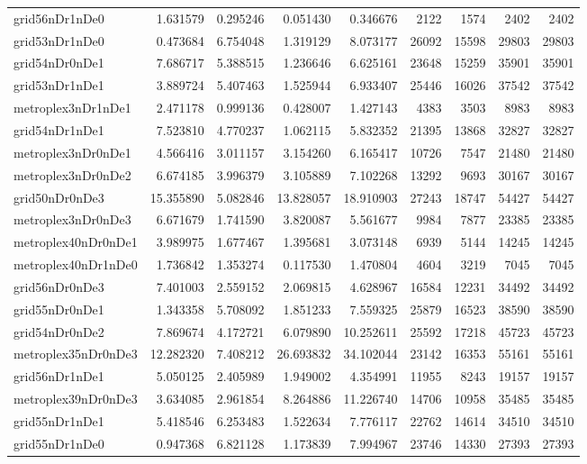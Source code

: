 \begin{longtable}{|l|r|r|r|r|r|r|r|r|}
grid56nDr1nDe0 & 1.631579 & 0.295246 & 0.051430 & 0.346676 & 2122 & 1574 & 2402 & 2402 \\
grid53nDr1nDe0 & 0.473684 & 6.754048 & 1.319129 & 8.073177 & 26092 & 15598 & 29803 & 29803 \\
grid54nDr0nDe1 & 7.686717 & 5.388515 & 1.236646 & 6.625161 & 23648 & 15259 & 35901 & 35901 \\
grid53nDr1nDe1 & 3.889724 & 5.407463 & 1.525944 & 6.933407 & 25446 & 16026 & 37542 & 37542 \\
metroplex3nDr1nDe1 & 2.471178 & 0.999136 & 0.428007 & 1.427143 & 4383 & 3503 & 8983 & 8983 \\
grid54nDr1nDe1 & 7.523810 & 4.770237 & 1.062115 & 5.832352 & 21395 & 13868 & 32827 & 32827 \\
metroplex3nDr0nDe1 & 4.566416 & 3.011157 & 3.154260 & 6.165417 & 10726 & 7547 & 21480 & 21480 \\
metroplex3nDr0nDe2 & 6.674185 & 3.996379 & 3.105889 & 7.102268 & 13292 & 9693 & 30167 & 30167 \\
grid50nDr0nDe3 & 15.355890 & 5.082846 & 13.828057 & 18.910903 & 27243 & 18747 & 54427 & 54427 \\
metroplex3nDr0nDe3 & 6.671679 & 1.741590 & 3.820087 & 5.561677 & 9984 & 7877 & 23385 & 23385 \\
metroplex40nDr0nDe1 & 3.989975 & 1.677467 & 1.395681 & 3.073148 & 6939 & 5144 & 14245 & 14245 \\
metroplex40nDr1nDe0 & 1.736842 & 1.353274 & 0.117530 & 1.470804 & 4604 & 3219 & 7045 & 7045 \\
grid56nDr0nDe3 & 7.401003 & 2.559152 & 2.069815 & 4.628967 & 16584 & 12231 & 34492 & 34492 \\
grid55nDr0nDe1 & 1.343358 & 5.708092 & 1.851233 & 7.559325 & 25879 & 16523 & 38590 & 38590 \\
grid54nDr0nDe2 & 7.869674 & 4.172721 & 6.079890 & 10.252611 & 25592 & 17218 & 45723 & 45723 \\
metroplex35nDr0nDe3 & 12.282320 & 7.408212 & 26.693832 & 34.102044 & 23142 & 16353 & 55161 & 55161 \\
grid56nDr1nDe1 & 5.050125 & 2.405989 & 1.949002 & 4.354991 & 11955 & 8243 & 19157 & 19157 \\
metroplex39nDr0nDe3 & 3.634085 & 2.961854 & 8.264886 & 11.226740 & 14706 & 10958 & 35485 & 35485 \\
grid55nDr1nDe1 & 5.418546 & 6.253483 & 1.522634 & 7.776117 & 22762 & 14614 & 34510 & 34510 \\
grid55nDr1nDe0 & 0.947368 & 6.821128 & 1.173839 & 7.994967 & 23746 & 14330 & 27393 & 27393 \\

\end{longtable}
